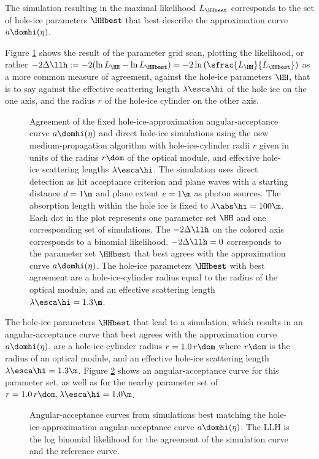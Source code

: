 The simulation resulting in the maximal likelihood $L_\HHbest$ corresponds to the set of hole-ice parameters $\HHbest$ that best describe the approximation curve $a\domhi(\eta)$.

Figure \ref{fig:AWa5aiCh} shows the result of the parameter grid scan, plotting the likelihood, or rather $-2\Delta\llh:= -2(\ln L_\HH - \ln L_\HHbest) = -2 \ln \left(\sfrac{L_\HH}{L_\HHbest}\right)$ as a more common measure of agreement, against the hole-ice parameters $\HH$, that is to say against the effective scattering length $\lambda\esca\hi$ of the hole ice on the one axis, and the radius $r$ of the hole-ice cylinder on the other axis.

\begin{figure}[htbp]
  \caption{Agreement of the fixed hole-ice-approximation angular-acceptance curve $a\domhi(\eta)$ and direct hole-ice simulations using the new \clsim medium-propagation algorithm with hole-ice-cylinder radii $r$ given in units of the radius $r\dom$ of the optical module, and effective hole-ice scattering lengths $\lambda\esca\hi$. The simulation uses direct detection as hit acceptance criterion and plane waves with a starting distance $d=1\m$ and plane extent $e=1\m$ as photon sources. The absorption length within the hole ice is fixed to $\lambda\abs\hi=100\m$. Each dot in the plot represents one parameter set $\HH$ and one corresponding set of simulations. The $-2\Delta\llh$ on the colored axis corresponds to a binomial likelihood. $-2\Delta\llh = 0$ corresponds to the parameter set $\HHbest$ that best agrees with the approximation curve $a\domhi(\eta)$. The hole-ice parameters $\HHbest$ with best agreement are a hole-ice-cylinder radius equal to the radius of the optical module, and an effective scattering length $\lambda\esca\hi = 1.3\m$.}
  \label{fig:AWa5aiCh}
\end{figure}

The hole-ice parameters $\HHbest$ that lead to a simulation, which results in an angular-acceptance curve that best agrees with the approximation curve $a\domhi(\eta)$, are a hole-ice-cylinder radius $r = 1.0\,r\dom$ where $r\dom$ is the radius of an optical module, and an effective hole-ice scattering length $\lambda\esca\hi = 1.3\m$. Figure \ref{fig:weShir8i} shows an angular-acceptance curve for this parameter set, as well as for the nearby parameter set of $r=1.0\,r\dom, \lambda\esca\hi = 1.0\m$.

\begin{figure}[htbp]
  \hfill
  \caption{Angular-acceptance curves from simulations best matching the hole-ice-approximation angular-acceptance curve $a\domhi(\eta)$. The LLH is the log binomial likelihood for the agreement of the simulation curve and the reference curve.}
  \label{fig:weShir8i}
\end{figure}


